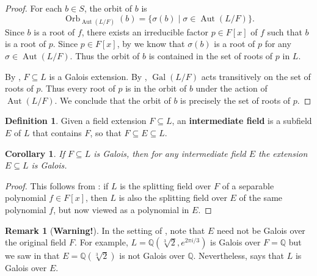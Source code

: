 \documentclass[12pt]{report}
\newtheorem{corollary}[theorem]{Corollary}
\numberwithin{equation}{section}
\numberwithin{theorem}{chapter}
\theoremstyle{definition}
\newtheorem{definition}[theorem]{Definition}
\newtheorem*{basic properties}{Basic Properties}
\newtheorem*{Important Remark}{Important Remark}
\newtheorem{remark}[theorem]{Remark}
\newcommand{\df}[1]{{\bf #1}\index{#1}}
\DeclareMathOperator{\Gal}{Gal}
\newcommand{\Q}{\mathbb{Q}}
\DeclareMathOperator{\Aut}{Aut}
\DeclareMathOperator{\Orb}{Orb}
\begin{document}
\begin{proof}
For each $b \in S$, the orbit of $b$ is 
$$\Orb_{\Aut(L/F)}(b) = \{\sigma(b) \mid \sigma\in \Aut(L/F)\}.$$ 
Since $b$ is a root of $f$, there exists an irreducible factor $p \in F[x]$ of $f$ such that $b$ is a root of $p$. Since $p \in F[x]$, by  we know that $\sigma(b)$ is a root of $p$ for any $\sigma \in \Aut(L/F)$. Thus the orbit of $b$ is contained in the set of roots of $p$ in $L$.

By , $F \subseteq L$ is a Galois extension. By , $\Gal(L/F)$ acts transitively on the set of roots of $p$. Thus every root of $p$ is in the orbit of $b$ under the action of $\Aut(L/F)$. We conclude that the orbit of $b$ is precisely the set of roots of $p$.
\end{proof}




\begin{definition}
Given a field extension $F \subseteq L$, an \df{intermediate field} is a subfield $E$ of $L$ that contains $F$, so that $F \subseteq E
\subseteq L$.
\end{definition}

\begin{corollary}\label{galois extension intermediate also galois}
If $F \subseteq L$ is Galois, then for any intermediate field $E$ the extension $E \subseteq L$ is Galois.
\end{corollary}

\begin{proof} 
This follows from : if $L$ is the splitting field over $F$ of a separable polynomial $f \in F[x]$, then $L$ is also the splitting field over $E$ of the same polynomial $f$, but now viewed as a polynomial in $E$.
\end{proof}



\begin{remark}[\bf Warning!] 
In the setting of , note that $E$ need not be Galois over the original field $F$. For example, $L = \Q(\sqrt[3]{2}, e^{2 \pi i/3})$ is Galois over $F = \Q$ but we saw in  that $E = \Q(\sqrt[3]{2})$ is not Galois over $\Q$. Nevertheless,  says that $L$ is Galois over $E$.
\end{remark}
\end{document}

